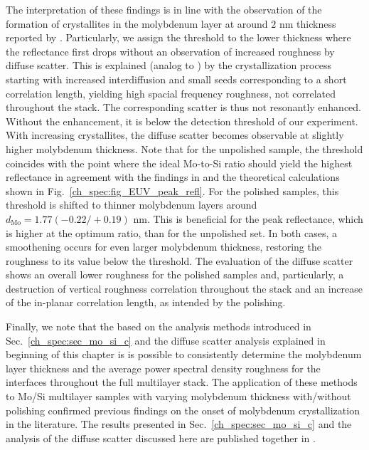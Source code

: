 The interpretation of these findings is in line with the observation of the formation of crystallites in the molybdenum layer at around $2$ nm thickness reported by \textcite{bajt_investigation_2001}. Particularly, we assign the threshold to the lower thickness where the reflectance first drops without an observation of increased roughness by diffuse scatter. This is explained (analog to \cite{bajt_investigation_2001}) by the crystallization  process starting with increased interdiffusion and small seeds corresponding to a short correlation length, yielding high spacial frequency roughness, not correlated throughout the stack. The corresponding scatter is thus not resonantly enhanced. Without the enhancement, it is below the detection threshold of our experiment. With increasing crystallites, the diffuse scatter becomes observable at slightly higher molybdenum thickness. Note that for the unpolished sample, the threshold coincides with the point where the ideal Mo-to-Si ratio should yield the highest reflectance in agreement with the findings in \cite{bajt_investigation_2001} and the theoretical calculations shown in Fig.~\ref{ch_spec:fig_EUV_peak_refl}. For the polished samples, this threshold is shifted to thinner molybdenum layers around $d_\text{Mo} = 1.77(-0.22/+0.19)$ nm. This is beneficial for the peak reflectance, which is higher at the optimum ratio, than for the unpolished set. In both cases, a smoothening occurs for even larger molybdenum thickness, restoring the roughness to its value below the threshold. The evaluation of the diffuse scatter shows an overall lower roughness for the polished samples and, particularly, a destruction of vertical roughness correlation throughout the stack and an increase of the in-planar correlation length, as intended by the polishing. 

Finally, we note that the based on the analysis methods introduced in Sec.~\ref{ch_spec:sec_mo_si_c} and the diffuse scatter analysis explained in beginning of this chapter is is possible to consistently determine the molybdenum layer thickness and the average power spectral density roughness for the interfaces throughout the full multilayer stack. The application of these methods to Mo/Si multilayer samples with varying molybdenum thickness with/without polishing confirmed previous findings on the onset of molybdenum crystallization in the literature. The results presented in Sec.~\ref{ch_spec:sec_mo_si_c} and the analysis of the diffuse scatter discussed here are published together in .

